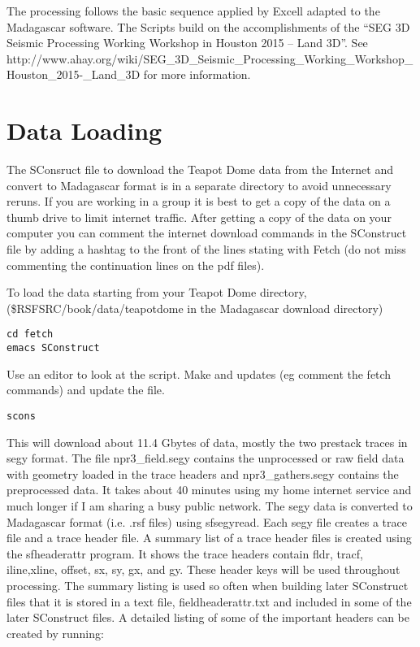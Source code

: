 The processing follows the basic sequence applied by Excell adapted to the Madagascar software.  The Scripts build on the accomplishments of the “SEG 3D Seismic Processing Working Workshop in Houston 2015 – Land 3D”.  See http://www.ahay.org/wiki/SEG\_3D\_Seismic\_Processing\_Working\_Workshop\_Houston\_2015-\_Land\_3D for more information.

\section{Data Loading}
The SConsruct file to download the Teapot Dome data from the Internet and convert to Madagascar format is in a separate directory to avoid unnecessary reruns.  If you are working in a group it is best to get a copy of the data on a thumb drive to limit internet traffic.  After getting a copy of the data on your computer you can comment the internet download commands in the SConstruct file by adding a hashtag to the front of the lines stating with Fetch (do not miss commenting the continuation lines on the pdf files).

To load the data starting from your Teapot Dome directory, (\$RSFSRC/book/data/teapotdome in the Madagascar download directory)

\begin{verbatim}
cd fetch
emacs SConstruct
\end{verbatim}  

Use an editor to look at the script.  Make and updates (eg comment the fetch
commands) and update the file.

\begin{verbatim}
scons 
\end{verbatim}  

This will download about 11.4 Gbytes of data, mostly the two prestack traces in segy format.  The file npr3\_field.segy contains the unprocessed or raw field data with geometry loaded in the trace headers and npr3\_gathers.segy contains the preprocessed data.  It takes about 40 minutes using my home internet service and much longer if I am sharing a busy public network.   The segy data is converted to Madagascar format (i.e. .rsf files) using sfsegyread.  Each segy file creates a trace file and a trace header file.  A summary list of a trace header files is created using the sfheaderattr program.  It shows the trace headers contain fldr, tracf, iline,xline, offset, sx, sy, gx, and gy.  These header keys will be used throughout processing.  The summary listing is used so often when building later SConstruct files that it is stored in a text file, fieldheaderattr.txt and included in some of the later SConstruct files.  A detailed listing of some of the important headers can be created by running:

